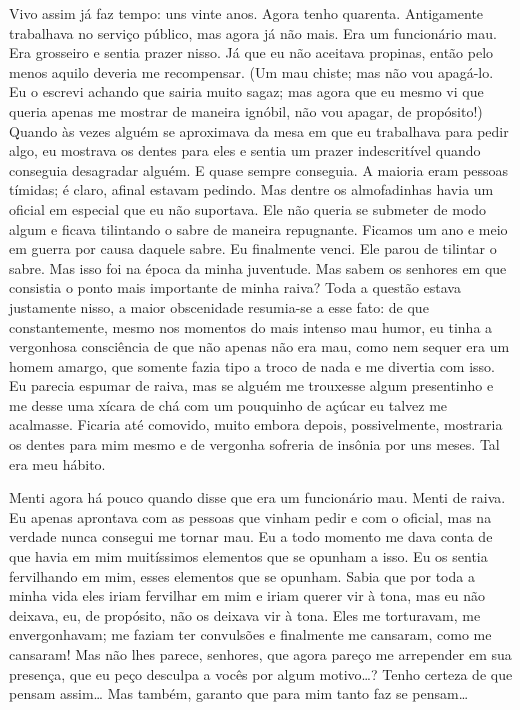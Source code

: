 Vivo assim já faz tempo: uns vinte anos. Agora tenho quarenta.
Antigamente trabalhava no serviço público, mas agora já não mais. Era
um funcionário mau. Era grosseiro e sentia prazer nisso. Já que eu não
aceitava propinas, então pelo menos aquilo deveria me recompensar. (Um
mau chiste; mas não vou apagá-lo. Eu o escrevi achando que sairia muito
sagaz; mas agora que eu mesmo vi que queria apenas me mostrar de
maneira ignóbil, não vou apagar, de propósito!) Quando às vezes alguém
se aproximava da mesa em que eu trabalhava para pedir algo, eu mostrava
os dentes para eles e sentia um prazer indescritível quando conseguia
desagradar alguém. E quase sempre conseguia. A maioria eram pessoas
tímidas; é claro, afinal estavam pedindo. Mas dentre os almofadinhas
havia um oficial em especial que eu não suportava. Ele não queria se
submeter de modo algum e ficava tilintando o sabre de maneira
repugnante. Ficamos um ano e meio em guerra por causa daquele sabre. Eu
finalmente venci. Ele parou de tilintar o sabre. Mas isso foi na época
da minha juventude. Mas sabem os senhores em que consistia o ponto mais
importante de minha raiva? Toda a questão estava justamente nisso, a
maior obscenidade resumia-se a esse fato: de que constantemente, mesmo
nos momentos do mais intenso mau humor, eu tinha a vergonhosa
consciência de que não apenas não era mau, como nem sequer era um homem
amargo, que somente fazia tipo a troco de nada e me divertia com isso.
Eu parecia espumar de raiva, mas se alguém me trouxesse algum
presentinho e me desse uma xícara de chá com um pouquinho de açúcar eu
talvez me acalmasse. Ficaria até comovido, muito embora depois,
possivelmente, mostraria os dentes para mim mesmo e de vergonha
sofreria de insônia por uns meses. Tal era meu hábito.

Menti agora há pouco quando disse que era um funcionário mau. Menti de
raiva. Eu apenas aprontava com as pessoas que vinham pedir e com o
oficial, mas na verdade nunca consegui me tornar mau. Eu a todo momento
me dava conta de que havia em mim muitíssimos elementos que se opunham
a isso. Eu os sentia fervilhando em mim, esses elementos que se
opunham. Sabia que por toda a minha vida eles iriam fervilhar em mim e
iriam querer vir à tona, mas eu não deixava, eu, de propósito, não os
deixava vir à tona. Eles me torturavam, me envergonhavam; me faziam ter
convulsões e finalmente me cansaram, como me cansaram! Mas não lhes
parece, senhores, que agora pareço me arrepender em sua presença, que
eu peço desculpa a vocês por algum motivo\ldots{}? Tenho certeza de que
pensam assim\ldots{} Mas também, garanto que para mim tanto faz se pensam\ldots{}

